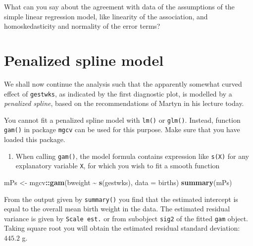 \documentclass[
]{book}
\newenvironment{Shaded}{\begin{snugshade}}{\end{snugshade}}
\newcommand{\AttributeTok}[1]{\textcolor[rgb]{0.13,0.29,0.53}{#1}}
\newcommand{\FunctionTok}[1]{\textcolor[rgb]{0.13,0.29,0.53}{\textbf{#1}}}
\newcommand{\NormalTok}[1]{#1}
\newcommand{\OtherTok}[1]{\textcolor[rgb]{0.56,0.35,0.01}{#1}}
\newcommand{\SpecialCharTok}[1]{\textcolor[rgb]{0.81,0.36,0.00}{\textbf{#1}}}
\providecommand{\tightlist}{%
  \setlength{\itemsep}{0pt}\setlength{\parskip}{0pt}}
\begin{document}
What can you say about the agreement with data of the
assumptions of the simple linear regression model,
like linearity of the association, and
homoskedasticity and normality of the error terms?

\section{Penalized spline model}\label{penalized-spline-model}

We shall now continue the analysis such that the
apparently somewhat curved effect of \texttt{gestwks}, as indicated by
the first diagnostic plot, is modelled by a \emph{penalized spline},
based on the recommendations of Martyn in his lecture today.

You cannot fit a penalized spline model with \texttt{lm()} or
\texttt{glm()}. Instead, function \texttt{gam()} in package
\texttt{mgcv} can be used for this purpose. Make sure that you have loaded
this package.

\begin{enumerate}
\def\labelenumi{\arabic{enumi}.}
\tightlist
\item
  When calling \texttt{gam()}, the model formula contains
  expression like \texttt{s(X)} for any explanatory variable \texttt{X},
  for which you wish to fit a smooth function
\end{enumerate}

\begin{Shaded}
\begin{Highlighting}[]
\NormalTok{mPs }\OtherTok{\textless{}{-}}\NormalTok{ mgcv}\SpecialCharTok{::}\FunctionTok{gam}\NormalTok{(bweight }\SpecialCharTok{\textasciitilde{}} \FunctionTok{s}\NormalTok{(gestwks), }\AttributeTok{data =}\NormalTok{ births)}
\FunctionTok{summary}\NormalTok{(mPs)}
\end{Highlighting}
\end{Shaded}

From the output given by \texttt{summary()} you find that the
estimated intercept is equal to the overall mean birth
weight in the data. The estimated residual variance is given by
\texttt{Scale\ est.} or from subobject \texttt{sig2} of the fitted
\texttt{gam} object. Taking square root you will obtain the estimated
residual standard deviation: \(445.2\) g.

\begin{Shaded}
\end{Shaded}
\end{document}
